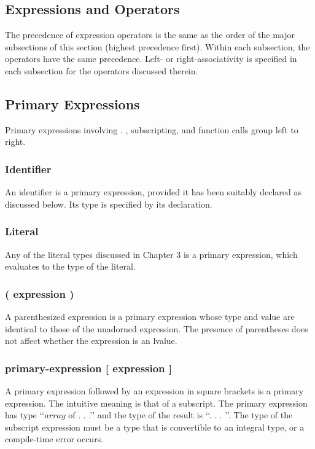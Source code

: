\begin{homeworkProblem}
	\section{Expressions and Operators}
    The precedence of expression operators is the same as the order of the major subsections of this section (highest precedence first). Within each subsection, the operators have the same precedence. Left- or right-associativity is specified in each subsection for the operators discussed therein.
	\subsection{Primary Expressions}
	Primary expressions involving . , subscripting, and function calls group left to right.
	
	\subsubsection{Identifier}
    An identifier is a primary expression, provided it has been suitably declared as discussed below. Its type is specified by its declaration.
    
	\subsubsection{Literal}
    Any of the literal types discussed in Chapter 3 is a primary expression, which evaluates to the type of the literal.

    \subsubsection{( expression )}
    A parenthesized expression is a primary expression whose type and value are identical to those of the unadorned expression. The presence of parentheses does not affect whether the expression is an lvalue.

    \subsubsection{primary-expression [ expression ]}
    A primary expression followed by an expression in square brackets is a primary expression. The intuitive meaning is that of a subscript. The primary expression has type ‘‘$array$ of . . .’’ and the type of the result is ‘‘. . . ’’. The type of the subscript expression must be a type that is convertible to an integral type, or a compile-time error occurs.


\end{homeworkProblem}

